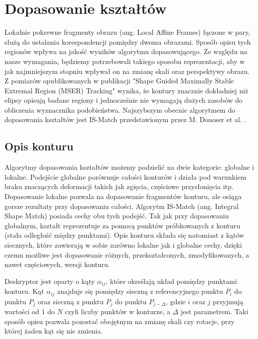 \chapter{Dopasowanie kształtów}

Lokalnie pokrewne fragmenty obrazu (ang. Local Affine Frames) łączone w pary,
służą do ustalania korespondencji pomiędzy dwoma obrazami. Sposób opisu tych
regionów wpływa na jakość wyników algorytmu dopasowującego. Ze względu na nasze
wymagania, będziemy potrzebowali takiego sposobu reprezentacji, aby w jak
najmniejszym stopniu wpływał on na zmianę skali oraz perspektywy obrazu. Z
pomiarów opublikowanych w publikacji "Shape Guided Maximally Stable Extremal
Region (MSER) Tracking" wynika, że kontury znacznie dokładniej niż elipsy
opisują badane regiony i jednocześnie nie wymagają dużych zasobów do obliczenia
wyznacznika podobieństwa. Najszybszym obecnie algorytmem do dopasowania
kształtów jest IS-Match przedstawionym przez M. Donoser et al. \cite{ismatch}.

\section{Opis konturu}

Algorytmy dopasowania kształtów możemy podzielić na dwie kategorie: globalne i
lokalne. Podejście globalne porównuje całości konturów i działa pod warunkiem
braku znaczących deformacji takich jak zgięcia, częściowe przysłonięcia itp.
Dopasowanie lokalne pozwala na dopasowanie fragmentów konturu, ale osiąga
gorsze rezultaty przy dopasowaniu całości. Algorytm IS-Match (ang. Integral
Shape Match) posiada cechy obu tych podejść. Tak jak przy dopasowaniu
globalnym, kształt reprezentuje za pomocą punktów próbkowanych z konturu (stała
odległość między punktami). Opis konturu składa się natomiast z kątów
siecznych, które zawierają w sobie zarówno lokalne jak i globalne cechy, dzięki
czemu możliwe jest dopasowanie różnych, przekształconych, zmodyfikowanych, a
nawet częściowych, wersji konturu.

Deskryptor jest oparty o kąty $\alpha_{ij}$, które określają układ pomiędzy
punktami konturu. Kąt $\alpha_{ij}$ znajduje się pomiędzy sieczną z
referencyjnego punktu $P_{i}$ do punktu $P_{j}$ oraz sieczną z punktu $P_{j}$
do punktu $P_{j-\Delta}$, gdzie $i$ oraz $j$ przyjmują wartości od $1$ do $N$
czyli liczby punktów w konturze, a $\Delta$ jest parametrem. Taki sposób opisu
pozwala pozostać obojętnym na zmianę skali czy rotacje, przy której żaden kąt
się nie zmienia.

